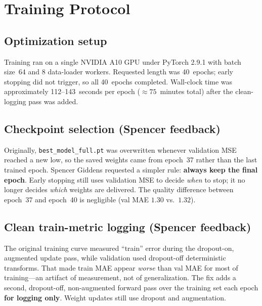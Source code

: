 \documentclass[12pt, letterpaper, titlepage]{article}
\begin{document}
\FloatBarrier
\section{Training Protocol}
\label{sec:train}

\subsection{Optimization setup}

Training ran on a single NVIDIA A10 GPU under PyTorch 2.9.1 with batch size~64 and 8 data-loader workers. Requested length was 40~epochs; early stopping did not trigger, so all 40~epochs completed. Wall-clock time was approximately 112--143~seconds per epoch ($\approx 75$~minutes total) after the clean-logging pass was added.

\subsection{Checkpoint selection (Spencer feedback)}

Originally, \texttt{best\_model\_full.pt} was overwritten whenever validation MSE reached a new low, so the saved weights came from epoch~37 rather than the last trained epoch. Spencer Giddens requested a simpler rule: \textbf{always keep the final epoch}. Early stopping still uses validation MSE to decide \emph{when} to stop; it no longer decides \emph{which} weights are delivered. The quality difference between epoch~37 and epoch~40 is negligible (val MAE $1.30$ vs.\ $1.32$).

\subsection{Clean train-metric logging (Spencer feedback)}

The original training curve measured ``train'' error during the dropout-on, augmented update pass, while validation used dropout-off deterministic transforms. That made train MAE appear \emph{worse} than val MAE for most of training---an artifact of measurement, not of generalization. The fix adds a second, dropout-off, non-augmented forward pass over the training set each epoch \textbf{for logging only}. Weight updates still use dropout and augmentation.
\end{document}
